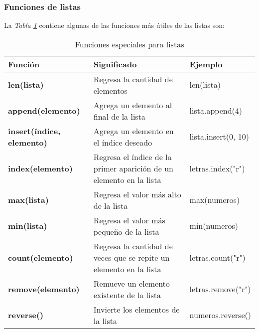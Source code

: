 \subsubsection{Funciones de listas}
\hspace{0.55cm}La \textit{Tabla \ref{tab: 8}} contiene algunas de las funciones más útiles de las listas son:
\begin{table}[H]
    \begin{center}
        \caption{Funciones especiales para listas}
        \label{tab: 8}
        \begin{tabular}{m{4cm} m{5cm} m{4cm}}
            \hline
            \textbf{Función}&\textbf{Significado}&\textbf{Ejemplo} \\
            \hline
            \textbf{len(lista)}					& Regresa la cantidad de elementos										& len(lista) \\
            \textbf{append(elemento)}			& Agrega un elemento al final de la lista								& lista.append(4) \\
            \textbf{insert(índice, elemento)}	& Agrega un elemento en el índice deseado 								& lista.insert(0, 10) \\
            \textbf{index(elemento)}			& Regresa el índice de la primer aparición de un elemento en la lista	& letras.index("r") \\
            \textbf{max(lista)}					& Regresa el valor más alto de la lista									& max(numeros) \\
            \textbf{min(lista)}					& Regresa el valor más pequeño de la lista								& min(numeros) \\
            \textbf{count(elemento)}			& Regresa la cantidad de veces que se repite un elemento en la lista	& letras.count("r") \\
            \textbf{remove(elemento)}			& Remueve un elemento existente de la lista								& letras.remove("r") \\
            \textbf{reverse()}					& Invierte los elementos de la lista										& numeros.reverse() \\
            \hline
        \end{tabular}
    \end{center}    
\end{table}


